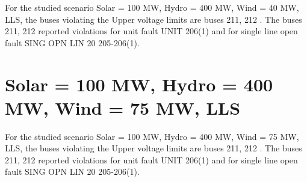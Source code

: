 \documentclass[10pt]{report}
\begin{document}
For the studied scenario Solar = 100 MW, Hydro = 400 MW, Wind = 40 MW, LLS, the buses violating the Upper voltage limits are buses 211, 212 .
The buses 211, 212 reported violations for unit fault UNIT 206(1) and for single line open fault SING OPN LIN   20 205-206(1).
\begin{table}[H]
\caption{Contingencies reporting bus voltages greater than emergency voltage of 1.1 PU for scenario Solar = 100 MW, Hydro = 400 MW, Wind = 40 MW, LLS}
\label{HVSolar100MWHydro400MWWind40MWLLS}
\centering
{}
\end{table}

\section{Solar = 100 MW, Hydro = 400 MW, Wind = 75 MW, LLS}

For the studied scenario Solar = 100 MW, Hydro = 400 MW, Wind = 75 MW, LLS, the buses violating the Upper voltage limits are buses 211, 212 .
The buses 211, 212 reported violations for unit fault UNIT 206(1) and for single line open fault SING OPN LIN   20 205-206(1).
\begin{table}[H]
\caption{Contingencies reporting bus voltages greater than emergency voltage of 1.1 PU for scenario Solar = 100 MW, Hydro = 400 MW, Wind = 75 MW, LLS}
\label{HVSolar100MWHydro400MWWind75MWLLS}
\centering
{}
\end{table}
\end{document}
